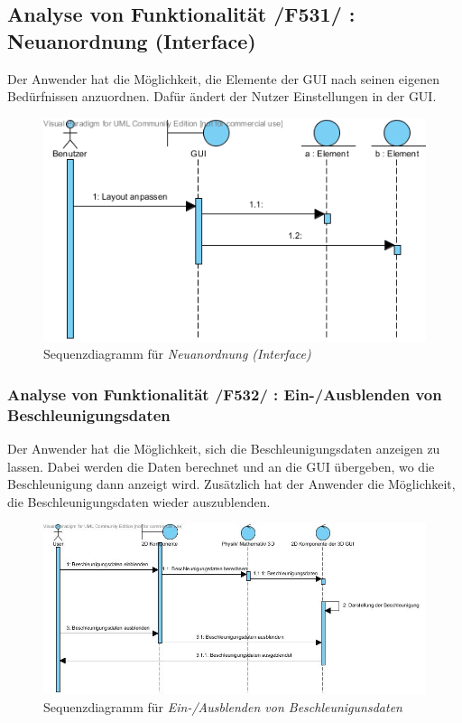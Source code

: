 \subsection{Analyse von Funktionalität /F531/ :   Neuanordnung (Interface)}
Der Anwender hat die Möglichkeit, die Elemente der GUI nach seinen eigenen Bedürfnissen anzuordnen. Dafür ändert der Nutzer Einstellungen in der GUI.
\begin{figure}
\includegraphics[width=16cm]{bilder/Interface_Neuanordnung}
\caption{Sequenzdiagramm für \textit{Neuanordnung (Interface)}}
\label{labelname}
\end{figure}
\subsubsection{Analyse von Funktionalität /F532/ :  Ein-/Ausblenden von Beschleunigungsdaten}
Der Anwender hat die Möglichkeit, sich die Beschleunigungsdaten anzeigen zu lassen. Dabei werden die Daten berechnet und an die GUI übergeben, wo die Beschleunigung dann anzeigt wird. Zusätzlich hat der Anwender die Möglichkeit, die Beschleunigungsdaten wieder auszublenden.
\begin{figure}
\includegraphics[width=16cm]{bilder/Simulator_Beschleunigung}
\caption{Sequenzdiagramm für \textit{Ein-/Ausblenden von Beschleunigunsdaten}}
\label{labelname}
\end{figure}
